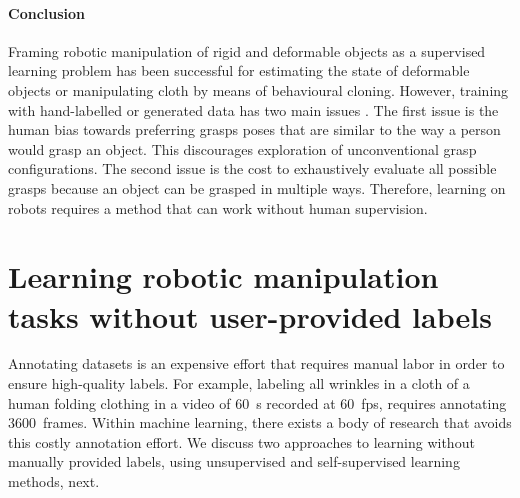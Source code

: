 \documentclass[\home/main.tex]{subfiles}
\begin{document}
\paragraph{Conclusion}
Framing robotic manipulation of rigid and deformable objects as a supervised learning problem has been successful for estimating the state of deformable objects or manipulating cloth by means of behavioural cloning. However, training with hand-labelled or generated data has two main issues \autocite{pinto2016supersizing}. The first issue is the human bias towards preferring grasps poses that are similar to the way a person would grasp an object. This discourages exploration of unconventional grasp configurations. The second issue is the cost to exhaustively evaluate all possible grasps because an object can be grasped in multiple ways. Therefore, learning on robots requires a method that can work without human supervision.

\section{Learning robotic manipulation tasks without user-provided labels} \label{sec:lit_learning_without_labels}
Annotating datasets is an expensive effort that requires manual labor in order to ensure high-quality labels. For example, labeling all wrinkles in a cloth of a human folding clothing in a video of \qty[mode=text]{60}{\second} recorded at \qty{60}{\unit{fps}}, requires annotating \qty{3600}{frames}. Within machine learning, there exists a body of research that avoids this costly annotation effort. We discuss two approaches to learning without manually provided labels, using unsupervised and self-supervised learning methods, next. 
\end{document}
